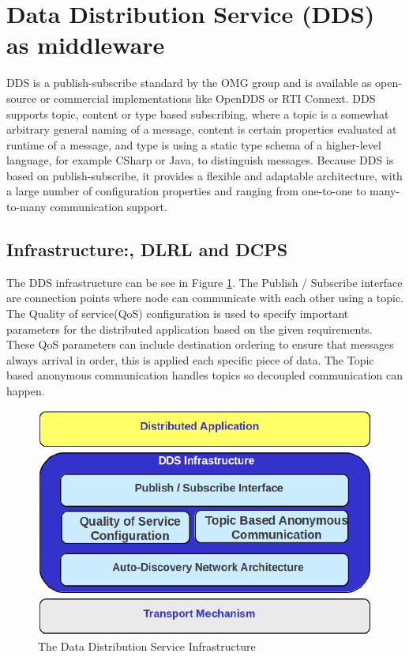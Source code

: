 \section{Data Distribution Service (DDS) as middleware}

DDS is a publish-subscribe standard by the OMG group and is available as open-source or commercial implementations like OpenDDS or RTI Connext. DDS supports topic, content or type based subscribing, where a topic is a somewhat arbitrary general naming of a message, content is certain properties evaluated at runtime of a message, and type is using a static type schema of a higher-level language, for example CSharp or Java, to distinguish messages. Because DDS is based on publish-subscribe, it provides a flexible and adaptable architecture, with a large number of configuration properties and ranging from one-to-one to many-to-many communication support.

\subsection{Infrastructure:, DLRL and DCPS}
The DDS infrastructure can be see in Figure \ref{fig:DDSIinfrastructure}. The Publish / Subscribe interface are connection points where node can communicate with each other using a topic. The Quality of service(QoS) configuration is used to specify important parameters for the distributed application based on the given requirements. These QoS parameters can include destination ordering to ensure that messages always arrival in order, this is applied each specific piece of data. The Topic based anonymous communication handles topics so  decoupled communication can happen.

\begin{figure}[h!]\label{}
	\centering
	\includegraphics[scale=0.8]{middleware/DDSIinfrastructure.png}
	\caption{The Data Distribution Service Infrastructure}
	\label{fig:DDSIinfrastructure}
\end{figure}

